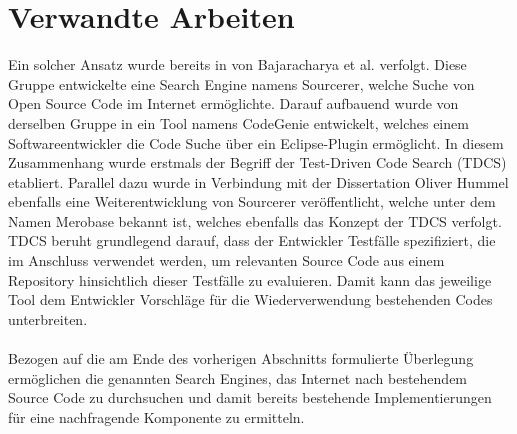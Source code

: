 \section{Verwandte Arbeiten}
Ein solcher Ansatz wurde bereits in \cite{sourcerer} von Bajaracharya et al.  verfolgt. Diese Gruppe entwickelte eine Search Engine namens Sourcerer, welche Suche von Open Source Code im Internet ermöglichte. Darauf aufbauend wurde von derselben Gruppe in \cite{Lemos} ein Tool namens CodeGenie entwickelt, welches einem Softwareentwickler die Code Suche über ein Eclipse-Plugin ermöglicht. In diesem Zusammenhang wurde erstmals der Begriff der Test-Driven Code Search (TDCS) etabliert. Parallel dazu wurde in Verbindung mit der Dissertation Oliver Hummel \cite{hummel08} ebenfalls eine Weiterentwicklung von Sourcerer veröffentlicht, welche unter dem Namen Merobase bekannt ist, welches ebenfalls das Konzept der TDCS verfolgt. TDCS beruht grundlegend darauf, dass der Entwickler Testfälle spezifiziert, die im Anschluss verwendet werden, um relevanten Source Code aus einem Repository hinsichtlich dieser Testfälle zu evaluieren. Damit kann das jeweilige Tool dem Entwickler Vorschläge für die Wiederverwendung bestehenden Codes unterbreiten.
\\\\
Bezogen auf die am Ende des vorherigen Abschnitts formulierte Überlegung ermöglichen die genannten Search Engines, das Internet nach bestehendem Source Code zu durchsuchen und damit bereits bestehende Implementierungen für eine nachfragende Komponente zu ermitteln. 